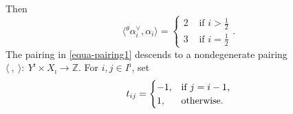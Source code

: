 \documentclass[a4,10pt]{amsart}
\numberwithin{equation}{section}
\theoremstyle{definition}
\newcommand{\thal}{{}^{\theta}\!\alpha}
\begin{document}
Then \begin{equation}\label{scalar23}\langle \thal^\vee_i, \alpha_i\rangle=
\begin{cases}
    2 & \text{ if } i>\frac{1}{2}\\
    3 & \text{ if } i= \frac{1}{2}
\end{cases}.\end{equation}
The pairing in \eqref{equa-pairing1} descends to a nondegenerate pairing
 $\langle\ ,\ \rangle : ~ Y^\imath\times X_\imath\longrightarrow \mathbb Z$.
For $i,j\in I^\imath$,   set 
\begin{equation}
\label{tij} 
t_{ij}=\begin{cases} 
-1, &\text{if $ j=i-1$,}\\
1, &\text{otherwise.}
\end{cases}
\end{equation}
\end{document}

